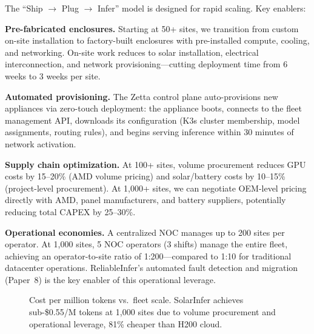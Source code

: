 \documentclass[conference,10pt,letterpaper]{IEEEtran}
\begin{document}
The ``Ship $\to$ Plug $\to$ Infer'' model is designed for rapid scaling. Key enablers:

\textbf{Pre-fabricated enclosures.} Starting at 50+ sites, we transition from custom on-site installation to factory-built enclosures with pre-installed compute, cooling, and networking. On-site work reduces to solar installation, electrical interconnection, and network provisioning---cutting deployment time from 6 weeks to 3 weeks per site.

\textbf{Automated provisioning.} The Zetta control plane auto-provisions new appliances via zero-touch deployment: the appliance boots, connects to the fleet management API, downloads its configuration (K3s cluster membership, model assignments, routing rules), and begins serving inference within 30 minutes of network activation.

\textbf{Supply chain optimization.} At 100+ sites, volume procurement reduces GPU costs by 15--20\% (AMD volume pricing) and solar/battery costs by 10--15\% (project-level procurement). At 1,000+ sites, we can negotiate OEM-level pricing directly with AMD, panel manufacturers, and battery suppliers, potentially reducing total CAPEX by 25--30\%.

\textbf{Operational economies.} A centralized NOC manages up to 200 sites per operator. At 1,000 sites, 5 NOC operators (3 shifts) manage the entire fleet, achieving an operator-to-site ratio of 1:200---compared to 1:10 for traditional datacenter operations. ReliableInfer's automated fault detection and migration (Paper~8) is the key enabler of this operational leverage.

\begin{figure}[!t]
\centering
{}
\caption{Cost per million tokens vs.\ fleet scale. SolarInfer achieves sub-\$0.55/M tokens at 1,000 sites due to volume procurement and operational leverage, 81\% cheaper than H200 cloud.}
\label{fig:scale_cost}
\end{figure}
\end{document}
